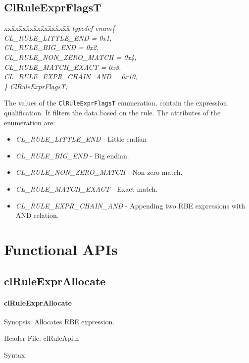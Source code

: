 \begin{flushleft}
\subsection{ClRuleExprFlagsT}
\begin{tabbing}
xx\=xx\=xx\=xx\=xx\=xx\=xx\=xx\=xx\=\kill
\textit{typedef enum\{}\\
\>\>\>\>\textit{CL\_RULE\_LITTLE\_END = 0x1,}\\
\>\>\>\>\textit{CL\_RULE\_BIG\_END = 0x2,}\\
\>\>\>\>\textit{CL\_RULE\_NON\_ZERO\_MATCH = 0x4,}\\
\>\>\>\>\textit{CL\_RULE\_MATCH\_EXACT = 0x8,}\\
\>\>\>\>\textit{CL\_RULE\_EXPR\_CHAIN\_AND = 0x10,}\\
\textit{\} ClRuleExprFlagsT;}\end{tabbing}
The values of the {\tt{ClRuleExprFlagsT}} enumeration, contain the expression qualification. It filters the data based on the rule. The attributes of the 
enumeration are:
\begin{itemize}
\item
\textit{CL\_\-RULE\_\-LITTLE\_\-END} - Little endian
\item
\textit{CL\_\-RULE\_\-BIG\_\-END} - Big endian.
\item
\textit{CL\_\-RULE\_\-NON\_\-ZERO\_\-MATCH} - Non-zero match.
\item
\textit{CL\_\-RULE\_\-MATCH\_\-EXACT} - Exact match.
\item
\textit{CL\_\-RULE\_\-EXPR\_\-CHAIN\_\-AND} - Appending two RBE expressions with AND relation.
\end{itemize}


\newpage

\section{Functional APIs}
\subsection{clRuleExprAllocate}

\hypertarget{pagerule101}{}\paragraph{cl\-Rule\-Expr\-Allocate}\label{pagerule101}
\begin{Desc}
\item[Synopsis:]Allocates RBE expression.\end{Desc}
\begin{Desc}
\item[Header File:]clRuleApi.h\end{Desc}
\begin{Desc}
\item[Syntax:]


\end{Desc}
\end{flushleft}

